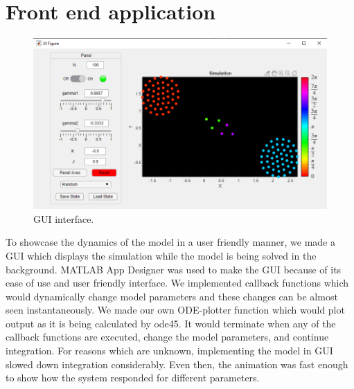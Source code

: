 \documentclass[superscriptaddress,reprint,amssymb, amsmath,aps, pre]{revtex4-1}
\begin{document}
\section{Front end application}
{
    \begin{figure}[h!]
        \includegraphics[width = \linewidth]{gui.png}
        \caption{GUI interface.}
    \end{figure} 
    To showcase the dynamics of the model in a user friendly manner, we made a GUI which displays the simulation while the model is being solved in the background. MATLAB App Designer was used to make the GUI because of its ease of use and user friendly interface. We implemented callback functions which would dynamically change model parameters and these changes can be almost seen instantaneously. We made our own ODE-plotter function which would plot output as it is being calculated by ode45. It would terminate when any of the callback functions are executed, change the model parameters, and continue integration. For reasons which are unknown, implementing the model in GUI slowed down integration considerably. Even then, the animation was fast enough to show how the system responded for different parameters. 
}
\end{document}
